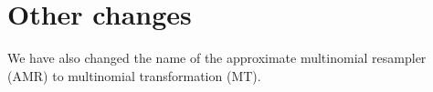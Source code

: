 \documentclass{article}
\begin{document}

  \section{Other changes}
  We have also changed the name of the approximate multinomial resampler (AMR) to multinomial transformation (MT).
  
\end{document}
